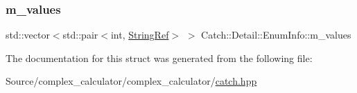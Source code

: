 \mbox{\label{struct_catch_1_1_detail_1_1_enum_info_ad65c0537a50d375859295a2c18ade489}} 
\subsubsection{\texorpdfstring{m\+\_\+values}{m\_values}}
{\footnotesize\ttfamily std\+::vector$<$std\+::pair$<$int, \mbox{\hyperlink{class_catch_1_1_string_ref}{String\+Ref}}$>$ $>$ Catch\+::\+Detail\+::\+Enum\+Info\+::m\+\_\+values}



The documentation for this struct was generated from the following file\+:\begin{DoxyCompactItemize}
\item 
Source/complex\+\_\+calculator/complex\+\_\+calculator/\mbox{\hyperlink{catch_8hpp}{catch.\+hpp}}\end{DoxyCompactItemize}
